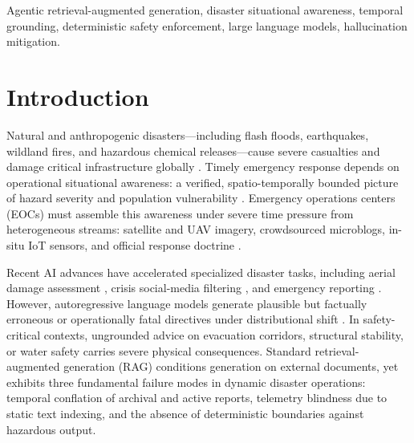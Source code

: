 \documentclass[conference]{IEEEtran}
\begin{document}
\begin{IEEEkeywords}
Agentic retrieval-augmented generation, disaster situational awareness, temporal grounding, deterministic safety enforcement, large language models, hallucination mitigation.
\end{IEEEkeywords}

\section{Introduction}
Natural and anthropogenic disasters---including flash floods, earthquakes, wildland fires, and hazardous chemical releases---cause severe casualties and damage critical infrastructure globally \cite{undrr}. Timely emergency response depends on operational situational awareness: a verified, spatio-temporally bounded picture of hazard severity and population vulnerability \cite{endsley,aboualola2023}. Emergency operations centers (EOCs) must assemble this awareness under severe time pressure from heterogeneous streams: satellite and UAV imagery, crowdsourced microblogs, in-situ IoT sensors, and official response doctrine \cite{crisismmd,aboualola2023}.

Recent AI advances have accelerated specialized disaster tasks, including aerial damage assessment \cite{singh}, crisis social-media filtering \cite{olteanu2015,dinani}, and emergency reporting \cite{cantini}. However, autoregressive language models generate plausible but factually erroneous or operationally fatal directives under distributional shift \cite{ji,yu2024}. In safety-critical contexts, ungrounded advice on evacuation corridors, structural stability, or water safety carries severe physical consequences. Standard retrieval-augmented generation (RAG) \cite{lewis} conditions generation on external documents, yet exhibits three fundamental failure modes in dynamic disaster operations: temporal conflation of archival and active reports, telemetry blindness due to static text indexing, and the absence of deterministic boundaries against hazardous output.
\end{document}
